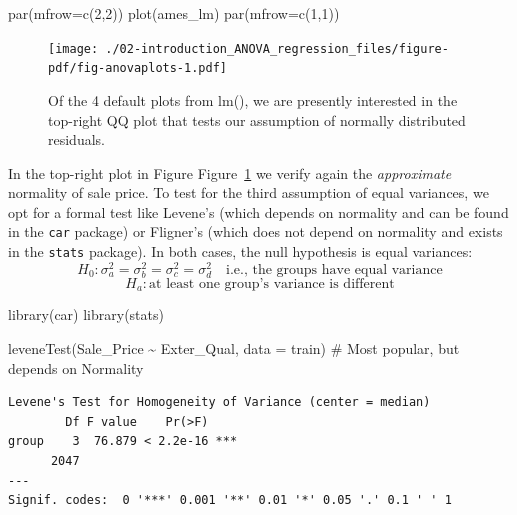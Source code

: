 \documentclass[
  letterpaper,
  DIV=11,
  numbers=noendperiod]{scrreprt}
\newenvironment{Shaded}{\begin{snugshade}}{\end{snugshade}}
\newcommand{\AttributeTok}[1]{\textcolor[rgb]{0.40,0.45,0.13}{#1}}
\newcommand{\CommentTok}[1]{\textcolor[rgb]{0.37,0.37,0.37}{#1}}
\newcommand{\DecValTok}[1]{\textcolor[rgb]{0.68,0.00,0.00}{#1}}
\newcommand{\FunctionTok}[1]{\textcolor[rgb]{0.28,0.35,0.67}{#1}}
\newcommand{\NormalTok}[1]{\textcolor[rgb]{0.00,0.23,0.31}{#1}}
\newcommand{\SpecialCharTok}[1]{\textcolor[rgb]{0.37,0.37,0.37}{#1}}
\begin{document}
\begin{Shaded}
\begin{Highlighting}[]
\FunctionTok{par}\NormalTok{(}\AttributeTok{mfrow=}\FunctionTok{c}\NormalTok{(}\DecValTok{2}\NormalTok{,}\DecValTok{2}\NormalTok{))}
\FunctionTok{plot}\NormalTok{(ames\_lm)}
\FunctionTok{par}\NormalTok{(}\AttributeTok{mfrow=}\FunctionTok{c}\NormalTok{(}\DecValTok{1}\NormalTok{,}\DecValTok{1}\NormalTok{))}
\end{Highlighting}
\end{Shaded}

\begin{figure}[H]

{\centering \texttt{[image: ./02-introduction\_ANOVA\_regression\_files/figure-pdf/fig-anovaplots-1.pdf]}

}

\caption{\label{fig-anovaplots}Of the 4 default plots from lm(), we are
presently interested in the top-right QQ plot that tests our assumption
of normally distributed residuals.}

\end{figure}

In the top-right plot in Figure Figure~\ref{fig-anovaplots} we verify
again the \emph{approximate} normality of sale price. To test for the
third assumption of equal variances, we opt for a formal test like
Levene's (which depends on normality and can be found in the
\texttt{car} package) or Fligner's (which does not depend on normality
and exists in the \texttt{stats} package). In both cases, the null
hypothesis is equal variances:
\[H_0: \sigma_a^2 =\sigma_b^2 =\sigma_c^2=\sigma_d^2 \quad  \text{i.e., the groups have equal variance}\]
\[H_a: \text{at least one group's variance is different}\]

\begin{Shaded}
\begin{Highlighting}[]
\FunctionTok{library}\NormalTok{(car)}
\FunctionTok{library}\NormalTok{(stats)}

\FunctionTok{leveneTest}\NormalTok{(Sale\_Price }\SpecialCharTok{\textasciitilde{}}\NormalTok{ Exter\_Qual, }\AttributeTok{data =}\NormalTok{ train) }\CommentTok{\# Most popular, but depends on Normality}
\end{Highlighting}
\end{Shaded}

\begin{verbatim}
Levene's Test for Homogeneity of Variance (center = median)
        Df F value    Pr(>F)    
group    3  76.879 < 2.2e-16 ***
      2047                      
---
Signif. codes:  0 '***' 0.001 '**' 0.01 '*' 0.05 '.' 0.1 ' ' 1
\end{verbatim}
\end{document}
